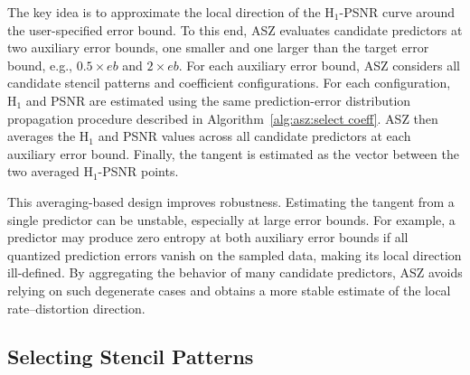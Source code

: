 The key idea is to approximate the local direction of the H$_1$-PSNR curve around the user-specified error bound.
To this end, ASZ evaluates candidate predictors at two auxiliary error bounds, one smaller and one larger than the target error bound, e.g., $0.5\times eb$ and $2\times eb$.
For each auxiliary error bound, ASZ considers all candidate stencil patterns and coefficient configurations.
For each configuration, H$_1$ and PSNR are estimated using the same prediction-error distribution propagation procedure described in Algorithm~\ref{alg:asz:select coeff}.
ASZ then averages the H$_1$ and PSNR values across all candidate predictors at each auxiliary error bound.
Finally, the tangent is estimated as the vector between the two averaged H$_1$-PSNR points.


This averaging-based design improves robustness.
Estimating the tangent from a single predictor can be unstable, especially at large error bounds.
For example, a predictor may produce zero entropy at both auxiliary error bounds if all quantized prediction errors vanish on the sampled data, making its local direction ill-defined.
By aggregating the behavior of many candidate predictors, ASZ avoids relying on such degenerate cases and obtains a more stable estimate of the local rate--distortion direction.

\subsection{Selecting Stencil Patterns}\label{sec:asz:select sp}



